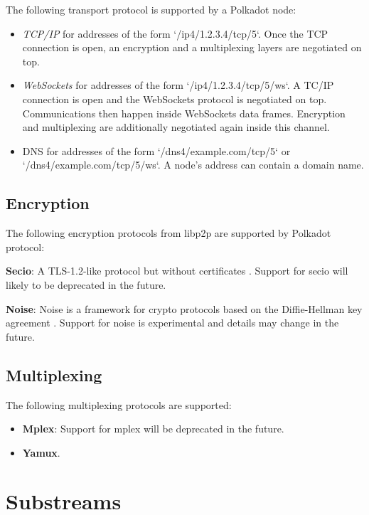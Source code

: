 \documentclass{book}
\newcommand{\tmem}[1]{{\em #1\/}}
\newcommand{\tmstrong}[1]{\textbf{#1}}
\newcommand{\tmtextbf}[1]{{\bfseries{#1}}}
\newcommand{\tmtextit}[1]{{\itshape{#1}}}
\providecommand{\tmem}[1]{\tmtextit{#1}}
\providecommand{\tmstrong}[1]{\tmtextbf{#1}}
\providecommand{\tmtextbf}[1]{\tmtextbf{#1}}
\providecommand{\tmtextit}[1]{\tmtextit{#1}}
\begin{document}
The following transport protocol is supported by a Polkadot node:
\begin{itemize}
  \item {\tmem{TCP/IP}} for addresses of the form `/ip4/1.2.3.4/tcp/5`. Once
  the TCP connection is open, an encryption and a multiplexing layers are
  negotiated on top.
  
  \item {\tmem{WebSockets}} for addresses of the form `/ip4/1.2.3.4/tcp/5/ws`.
  A TC/IP connection is open and the WebSockets protocol is negotiated on top.
  Communications then happen inside WebSockets data frames. Encryption and
  multiplexing are additionally negotiated again inside this channel.
  
  \item DNS for addresses of the form `/dns4/example.com/tcp/5` or
  `/dns4/example.com/tcp/5/ws`. A node's address can contain a domain name.
\end{itemize}

\subsection{Encryption}

The following encryption protocols from libp2p are supported by Polkadot
protocol:

\item {\tmstrong{Secio}}: A TLS-1.2-like protocol but without certificates
{\cite{protocol_labs_libp2p_2019}}. Support for secio will likely to be
deprecated in the future.

\item {\tmstrong{Noise}}: Noise is a framework for crypto protocols based on
the Diffie-Hellman key agreement {\cite{perrin_noise_2018}}. Support for noise
is experimental and details may change in the future.

\subsection{Multiplexing}

The following multiplexing protocols are supported:
\begin{itemize}
  \item {\tmstrong{Mplex}}: Support for mplex will be deprecated in the
  future.
  
  \item {\tmstrong{Yamux}}.
\end{itemize}

\section{Substreams}
\end{document}
